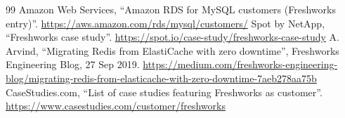 \documentclass[10pt,a4paper]{article}
\begin{document}
\begin{thebibliography}{99}
 Amazon Web Services, ``Amazon RDS for MySQL customers (Freshworks entry)''. \url{https://aws.amazon.com/rds/mysql/customers/}
 Spot by NetApp, ``Freshworks case study''. \url{https://spot.io/case-study/freshworks-case-study}
 A. Arvind, ``Migrating Redis from ElastiCache with zero downtime'', Freshworks Engineering Blog, 27 Sep 2019. \url{https://medium.com/freshworks-engineering-blog/migrating-redis-from-elasticache-with-zero-downtime-7aeb278aa75b}
 CaseStudies.com, ``List of case studies featuring Freshworks as customer''. \url{https://www.casestudies.com/customer/freshworks}
\end{thebibliography}
\end{document}
